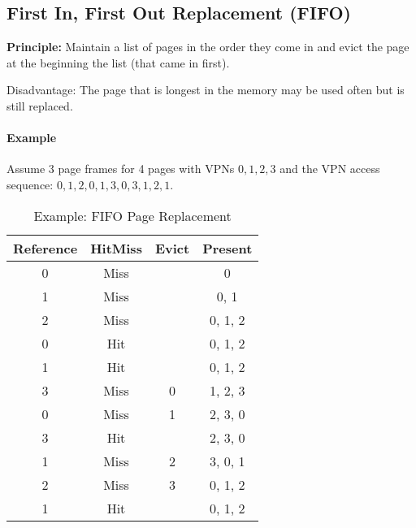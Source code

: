 \documentclass[a4paper, 11pt, accentcolor = tud3b]{tudreport}
\begin{document}
            \subsection{First In, First Out Replacement (FIFO)} %
                \textbf{Principle:} Maintain a list of pages in the order they come in and evict the page at the beginning the list (that came in first).
                
                Disadvantage: The page that is longest in the memory may be used often but is still replaced.
                
                \paragraph{Example}
	                Assume 3 page frames for 4 pages with VPNs \( 0, 1, 2, 3 \) and the VPN access sequence: \( 0, 1, 2, 0, 1, 3, 0, 3, 1, 2, 1 \).
	                \begin{table}[H]
	                	\centering
	                	\begin{tabular}{c|c|c|c}
	                		\textbf{Reference} & \textbf{Hit}\textbf{Miss} & \textbf{Evict} & \textbf{Present} \\ \hline
	                		        0          &           Miss            &                &        0         \\
	                		        1          &           Miss            &                &       0, 1       \\
	                		        2          &           Miss            &                &     0, 1, 2      \\
	                		        0          &            Hit            &                &     0, 1, 2      \\
	                		        1          &            Hit            &                &     0, 1, 2      \\
	                		        3          &           Miss            &       0        &     1, 2, 3      \\
	                		        0          &           Miss            &       1        &     2, 3, 0      \\
	                		        3          &            Hit            &                &     2, 3, 0      \\
	                		        1          &           Miss            &       2        &     3, 0, 1      \\
	                		        2          &           Miss            &       3        &     0, 1, 2      \\
	                		        1          &            Hit            &                &     0, 1, 2
	                	\end{tabular}
	                	\caption{Example: FIFO Page Replacement}
	                \end{table}
\end{document}
